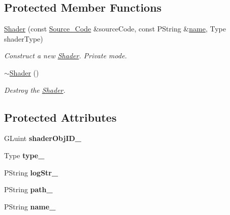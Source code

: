 \subsection*{Protected Member Functions}
\begin{DoxyCompactItemize}
\item 
\mbox{\hyperlink{classprz_1_1_shader_ad5d70da7c366bead1cc7bd5f327e23c7}{Shader}} (const \mbox{\hyperlink{classprz_1_1_source___code}{Source\+\_\+\+Code}} \&source\+Code, const P\+String \&\mbox{\hyperlink{classprz_1_1_shader_a2ba459fe4dc556e94ab73df91d2c0a4e}{name}}, Type shader\+Type)
\begin{DoxyCompactList}\small\item\em Construct a new \mbox{\hyperlink{classprz_1_1_shader}{Shader}}. Private mode. \end{DoxyCompactList}\item 
\mbox{\hyperlink{classprz_1_1_shader_a6a3e46f3adf75a523eb8d043ed476630}{$\sim$\+Shader}} ()
\begin{DoxyCompactList}\small\item\em Destroy the \mbox{\hyperlink{classprz_1_1_shader}{Shader}}. \end{DoxyCompactList}\end{DoxyCompactItemize}
\subsection*{Protected Attributes}
\begin{DoxyCompactItemize}
\item 
\mbox{\label{classprz_1_1_shader_aac996d2c1d0c69189441694e3b81a183}} 
G\+Luint {\bfseries shader\+Obj\+I\+D\+\_\+}
\item 
\mbox{\label{classprz_1_1_shader_abeff929418ee3e74c8d26d2165235ab3}} 
Type {\bfseries type\+\_\+}
\item 
\mbox{\label{classprz_1_1_shader_a9a1650751c1226e4165efdbd7107d102}} 
P\+String {\bfseries log\+Str\+\_\+}
\item 
\mbox{\label{classprz_1_1_shader_a79d120a5af0fc34a39669fb30752d0f9}} 
P\+String {\bfseries path\+\_\+}
\item 
\mbox{\label{classprz_1_1_shader_a190f3bf5449696c0661e987b4287e325}} 
P\+String {\bfseries name\+\_\+}
\end{DoxyCompactItemize}


